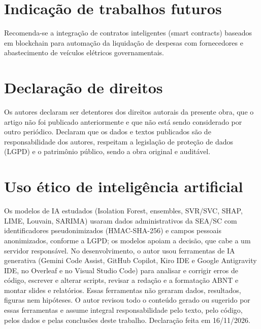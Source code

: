 \documentclass[12pt,a4paper]{article}
\begin{document}
\section{Indicação de trabalhos futuros}

Recomenda-se a integração de contratos inteligentes (smart contracts) baseados em blockchain para automação da liquidação de despesas com fornecedores e abastecimento de veículos elétricos governamentais.


\section{Declaração de direitos}

Os autores declaram ser detentores dos direitos autorais da presente obra, que o artigo não foi publicado anteriormente e que não está sendo considerado por outro periódico. Declaram que os dados e textos publicados são de responsabilidade dos autores, respeitam a legislação de proteção de dados (LGPD) e o patrimônio público, sendo a obra original e auditável.


\section*{Uso ético de inteligência artificial}
Os modelos de IA estudados (Isolation Forest, ensembles, SVR/SVC, SHAP, LIME, Louvain, SARIMA) usaram dados administrativos da SEA/SC com identificadores pseudonimizados (HMAC-SHA-256) e campos pessoais anonimizados, conforme a LGPD; os modelos apoiam a decisão, que cabe a um servidor responsável. No desenvolvimento, o autor usou ferramentas de IA generativa (Gemini Code Assist, GitHub Copilot, Kiro IDE e Google Antigravity IDE, no Overleaf e no Visual Studio Code) para analisar e corrigir erros de código, escrever e alterar scripts, revisar a redação e a formatação ABNT e montar slides e relatórios. Essas ferramentas não geraram dados, resultados, figuras nem hipóteses. O autor revisou todo o conteúdo gerado ou sugerido por essas ferramentas e assume integral responsabilidade pelo texto, pelo código, pelos dados e pelas conclusões deste trabalho. Declaração feita em 16/11/2026.
\end{document}
